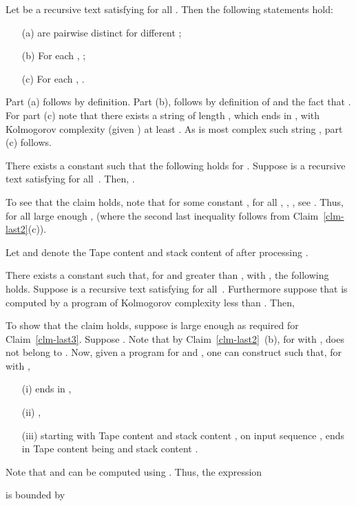\documentclass{LMCS}
\theoremstyle{plain}\newtheorem{athm}[thm]{Theorem}
\theoremstyle{plain}\newtheorem{aprop}[thm]{Proposition}
\theoremstyle{plain}\newtheorem{aprob}[thm]{Open Problem}
\theoremstyle{plain}\newtheorem{acor}[thm]{Corollary}
\theoremstyle{plain}\newtheorem{alem}[thm]{Lemma}
\theoremstyle{definition}\newtheorem{adefn}[thm]{Definition}
\theoremstyle{definition}\newtheorem{arem}[thm]{Remark}
\theoremstyle{plain}\newtheorem{aexmp}[thm]{Example}
\theoremstyle{plain}\newtheorem{aclm}[thm]{Claim}
\begin{document}
\begin{clm}\label{clm-last2}
Let  be a recursive text satisfying  for all .
Then the following statements hold:
\begin{enumerate}[(a)]
\item[(a)]  are pairwise distinct for different ;
\item[(b)] For each , ;
\item[(c)] For each , .
\end{enumerate}
\end{clm}

\noindent
Part (a) follows by definition. Part (b), follows by definition
of  and the fact that .
For part (c) note that
there exists a string  of length , which
ends in , with Kolmogorov complexity
(given )
at least . As  is most complex such string
, part (c) follows.

\begin{clm}\label{clm-last3}
There exists a constant  such that the following holds for .
Suppose  is a recursive text satisfying  for all~.
Then,
.
\end{clm}

\noindent
To see that the claim holds,
note that for some constant , for all ,
,
,
see \cite{LV08}.
Thus, for all large enough ,
 (where the second last inequality follows from
Claim~\ref{clm-last2}(c)).

Let  and  denote the Tape  content and stack content of 
after processing .

\begin{clm}\label{clm-last4}
There exists a constant  such that, for  and  greater than ,
with , the following holds.
Suppose  is a recursive text
satisfying  for all~. Furthermore suppose
that  is computed by a program of Kolmogorov complexity less than 
. Then,


\end{clm}

\noindent
To show that the claim holds, 
suppose  is large enough as required for Claim~\ref{clm-last3}.
Suppose .
Note that by Claim~\ref{clm-last2}~(b), for  with ,
 does not belong to .
Now, given a program for  and ,
one can construct  such that,
for  with ,
\begin{enumerate}[(i)]
\item[(i)]  ends in ,
\item[(ii)] ,
\item[(iii)]  starting with Tape  content  and stack
content , on
input sequence ,
ends in  Tape  content being  and stack content .
\end{enumerate}
Note that  and  can be computed using
. Thus, the expression
\begin{quote}

\end{quote}
is bounded by
\end{document}
